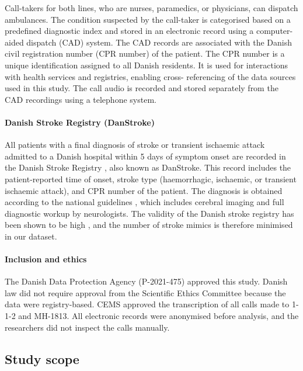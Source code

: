 {Call-takers for both lines, who are nurses, paramedics, or physicians, can dispatch ambulances. The condition suspected by the call-taker is categorised based on a predefined diagnostic index and stored in an electronic record using a computer-aided dispatch (CAD) system. The CAD records are associated with the Danish civil registration number (CPR number) \cite{cite19} of the patient. The CPR number is a unique identification assigned to all Danish residents. It is used for interactions with health services and registries, enabling cross- referencing of the data sources used in this study. The call audio is recorded and stored separately from the CAD recordings using a telephone system.

\paragraph{Danish Stroke Registry (DanStroke)}

All patients with a final diagnosis of stroke or transient ischaemic attack admitted to a Danish hospital within 5 days of symptom onset are recorded in the Danish Stroke Registry \cite{cite16}, also known as DanStroke. This record includes the patient-reported time of onset, stroke type (haemorrhagic, ischaemic, or transient ischaemic attack), and CPR number of the patient.
The diagnosis is obtained according to the national guidelines \cite{baluenfeldt_national_2021}, which includes cerebral imaging and full diagnostic workup by neurologists. The validity of the Danish stroke registry has been shown to be high \cite{wildenschild_registration_2013}, and the number of stroke mimics is therefore minimised in our dataset.


\paragraph{Inclusion and ethics}

The Danish Data Protection Agency (P-2021-475) approved this study. Danish law did not require approval from the Scientific Ethics Committee because the data were registry-based. CEMS approved the transcription of all calls made to 1-1-2 and MH-1813. All electronic records were anonymised before analysis, and the researchers did not inspect the calls manually.


\subsection{Study scope}

}
